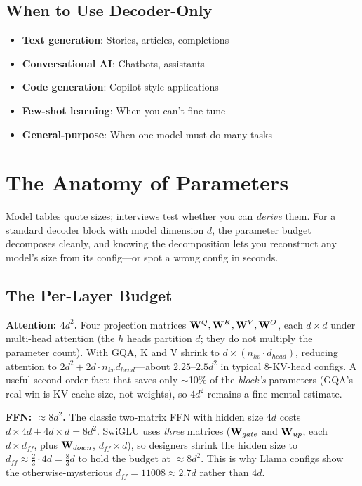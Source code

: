 \subsection{When to Use Decoder-Only}

\begin{itemize}
    \item \textbf{Text generation}: Stories, articles, completions
    \item \textbf{Conversational AI}: Chatbots, assistants
    \item \textbf{Code generation}: Copilot-style applications
    \item \textbf{Few-shot learning}: When you can't fine-tune
    \item \textbf{General-purpose}: When one model must do many tasks
\end{itemize}

\section{The Anatomy of Parameters}
\label{sec:parameter_anatomy}

Model tables quote sizes; interviews test whether you can \emph{derive} them. For a standard decoder block with model dimension $d$, the parameter budget decomposes cleanly, and knowing the decomposition lets you reconstruct any model's size from its config---or spot a wrong config in seconds.

\subsection{The Per-Layer Budget}

\textbf{Attention: $4d^2$.} Four projection matrices $\mathbf{W}^Q, \mathbf{W}^K, \mathbf{W}^V, \mathbf{W}^O$, each $d \times d$ under multi-head attention (the $h$ heads partition $d$; they do not multiply the parameter count). With GQA, K and V shrink to $d \times (n_{kv} \cdot d_{head})$, reducing attention to $2d^2 + 2 d \cdot n_{kv} d_{head}$---about $2.25$--$2.5d^2$ in typical 8-KV-head configs. A useful second-order fact: that saves only $\sim$10\% of the \emph{block's} parameters (GQA's real win is KV-cache size, not weights), so $4d^2$ remains a fine mental estimate.

\textbf{FFN: $\approx 8d^2$.} The classic two-matrix FFN with hidden size $4d$ costs $d \times 4d + 4d \times d = 8d^2$. SwiGLU uses \emph{three} matrices ($\mathbf{W}_{gate}$ and $\mathbf{W}_{up}$, each $d \times d_{ff}$, plus $\mathbf{W}_{down}$, $d_{ff} \times d$), so designers shrink the hidden size to $d_{ff} \approx \tfrac{2}{3} \cdot 4d = \tfrac{8}{3}d$ to hold the budget at $\approx 8d^2$. This is why Llama configs show the otherwise-mysterious $d_{ff} = 11008 \approx 2.7d$ rather than $4d$.

